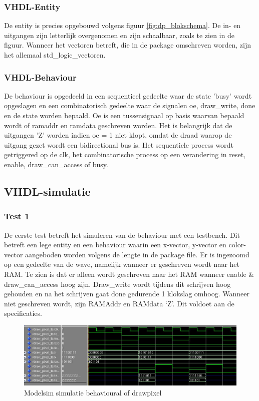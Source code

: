 \documentclass{scrartcl} %
\begin{document}
\subsubsection{VHDL-Entity}
De entity is precies opgebouwd volgens  figuur  \ref{fig:dp_blokschema}. De in- en uitgangen zijn letterlijk overgenomen en zijn schaalbaar, zoals te zien in de figuur. Wanneer het vectoren betreft, die in de package omschreven worden, zijn het allemaal std\_logic\_vectoren. 

\subsubsection{VHDL-Behaviour}
De behaviour is opgedeeld in een sequentieel gedeelte waar de state 'busy' wordt opgeslagen en een combinatorisch gedeelte waar de signalen oe, draw\_write, done en de state worden bepaald. Oe is een tussensignaal op basis waarvan bepaald wordt of ramaddr en ramdata geschreven worden. Het is belangrijk dat de uitgangen 'Z' worden indien oe = 1 niet klopt, omdat de draad waarop de uitgang gezet wordt een bidirectional bus is. Het sequentiele process wordt getriggered op de clk, het combinatorische process op een verandering in reset, enable, draw\_can\_access of busy. 

\subsection{VHDL-simulatie}
\subsubsection{Test 1}
De eerste test betreft het simuleren van de behaviour met een testbench. Dit betreft een lege entity en een behaviour waarin een x-vector, y-vector en color-vector aangeboden worden volgens de lengte in de package file.  Er is ingezoomd op een gedeelte van de wave, namelijk wanneer er geschreven wordt naar het RAM. Te zien is dat er alleen wordt geschreven naar het RAM wanneer enable \& draw\_can\_access hoog zijn.  Draw\_write wordt tijdens dit schrijven hoog gehouden en na het schrijven gaat done gedurende 1 klokslag omhoog. Wanneer niet geschreven wordt,  zijn RAMAddr en RAMdata `Z'. Dit voldoet aan de specificaties. 

\begin{figure} [h!]
\centering
\includegraphics [width = \textwidth] {resource/dp_new_wave.jpg}
\caption{Modelsim simulatie behavioural of drawpixel}
\label{fig:dp_sim}
\end{figure}
\end{document}
